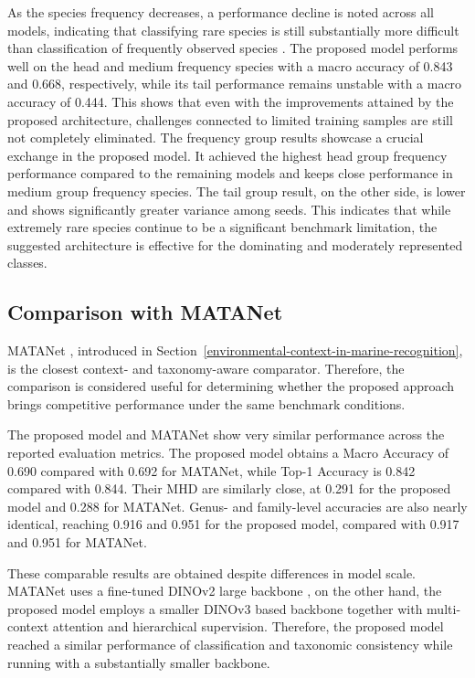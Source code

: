 \documentclass[preprint,12pt]{elsarticle}
\begin{document}
As the species frequency decreases, a performance decline is noted
across all models, indicating that classifying rare species is still
substantially more difficult than classification of frequently observed
species \citep{ref10,ref15}. The proposed model performs well
on the head and medium frequency species with a macro accuracy of 0.843
and 0.668, respectively, while its tail performance remains unstable
with a macro accuracy of 0.444. This shows that even with the
improvements attained by the proposed architecture, challenges connected
to limited training samples are still not completely eliminated. The
frequency group results showcase a crucial exchange in the proposed
model. It achieved the highest head group frequency performance compared
to the remaining models and keeps close performance in medium group
frequency species. The tail group result, on the other side, is lower
and shows significantly greater variance among seeds. This indicates
that while extremely rare species continue to be a significant benchmark
limitation, the suggested architecture is effective for the dominating
and moderately represented classes.

\subsection{Comparison with MATANet}\label{comparison-with-matanet}

MATANet \citep{ref26}, introduced in Section~\ref{environmental-context-in-marine-recognition},
is the closest context- and taxonomy-aware comparator. Therefore, the
comparison is considered useful for determining whether the proposed
approach brings competitive performance under the same benchmark
conditions.

The proposed model and MATANet show very similar performance across the
reported evaluation metrics. The proposed model obtains a Macro Accuracy
of 0.690 compared with 0.692 for MATANet, while Top-1 Accuracy is 0.842
compared with 0.844. Their MHD are similarly close, at 0.291 for the
proposed model and 0.288 for MATANet. Genus- and family-level accuracies
are also nearly identical, reaching 0.916 and 0.951 for the proposed
model, compared with 0.917 and 0.951 for MATANet.

These comparable results are obtained despite differences in model
scale. MATANet uses a fine-tuned DINOv2 large backbone
\citep{ref47}, on the other hand, the proposed
model employs a smaller DINOv3 based backbone
\citep{ref25} together with multi-context
attention and hierarchical supervision. Therefore, the proposed model
reached a similar performance of classification and taxonomic
consistency while running with a substantially smaller backbone.
\end{document}
